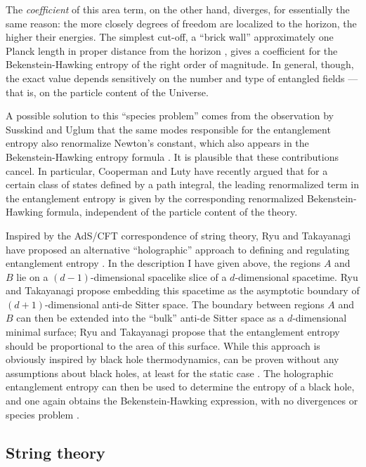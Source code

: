 \documentclass[12pt]{article}
\begin{document}
The \emph{coefficient} of this area term, on the other hand, diverges, 
for  essentially the same reason: the more closely degrees of 
freedom are localized to the horizon, the higher their energies.
The simplest cut-off, a ``brick wall'' approximately one Planck
length in proper distance from the horizon \cite{tHooft}, gives a
coefficient for the Bekenstein-Hawking entropy of the right order
of magnitude.  In general, though, the exact value depends
sensitively on the number and type of entangled fields --- that
is, on the particle content of the Universe.

A possible solution to this ``species problem'' comes from the
observation by Susskind and Uglum that the same modes responsible
for the entanglement entropy also renormalize Newton's constant,
which also appears in the Bekenstein-Hawking entropy formula
\cite{SussUg}.  It is plausible that these contributions cancel.  In
particular, Cooperman and Luty \cite{Coop} have recently argued 
that for a certain class of states defined by a path integral, the
leading renormalized term in the entanglement entropy is given by
the corresponding renormalized Bekenstein-Hawking formula,
independent of the particle content of the theory.

Inspired by the AdS/CFT correspondence of string theory, Ryu
and Takayanagi have proposed an alternative ``holographic'' 
approach to defining and regulating entanglement entropy
\cite{Ryu,Hubeny}.  In the description I have given above, the
regions $A$ and $B$ lie on a $(d-1)$-dimensional spacelike 
slice of a $d$-dimensional spacetime.  Ryu and Takayanagi
propose embedding this spacetime as the asymptotic boundary 
of $(d+1)$-dimensional anti-de Sitter space.  The boundary 
between regions $A$ and $B$ can then be extended into the ``bulk'' 
anti-de Sitter space as a $d$-dimensional minimal surface; Ryu 
and Takayanagi propose that the entanglement entropy should 
be proportional to the area of this surface.  While this approach 
is obviously inspired by black hole thermodynamics, can be 
proven without any assumptions about black holes, at least for 
the static case \cite{Lewkowycz}.  The holographic entanglement 
entropy can then be used to determine the entropy of a black hole, 
and one again obtains the Bekenstein-Hawking expression, with no 
divergences or species problem \cite{Emparanb}.

\subsection{String theory}
\end{document}
